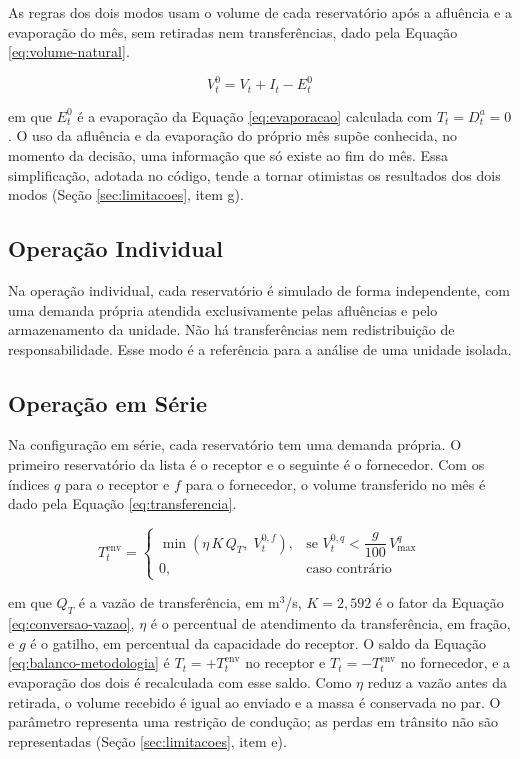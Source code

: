 As regras dos dois modos usam o volume de cada reservatório após a afluência e a evaporação do mês, sem retiradas nem transferências, dado pela Equação \ref{eq:volume-natural}.

\begin{equation}
    V^{0}_t = V_t + I_t - E^{0}_t
    \label{eq:volume-natural}
\end{equation}

em que $E^{0}_t$ é a evaporação da Equação \ref{eq:evaporacao} calculada com $T_t = D^{a}_t = 0$. O uso da afluência e da evaporação do próprio mês supõe conhecida, no momento da decisão, uma informação que só existe ao fim do mês. Essa simplificação, adotada no código, tende a tornar otimistas os resultados dos dois modos (Seção \ref{sec:limitacoes}, item g).

\subsection{Operação Individual}
\label{subsec:operacao-individual}

Na operação individual, cada reservatório é simulado de forma independente, com uma demanda própria atendida exclusivamente pelas afluências e pelo armazenamento da unidade. Não há transferências nem redistribuição de responsabilidade. Esse modo é a referência para a análise de uma unidade isolada.

\subsection{Operação em Série}
\label{subsec:operacao-serie}

Na configuração em série, cada reservatório tem uma demanda própria. O primeiro reservatório da lista é o receptor e o seguinte é o fornecedor. Com os índices $q$ para o receptor e $f$ para o fornecedor, o volume transferido no mês é dado pela Equação \ref{eq:transferencia}.

\begin{equation}
    T^{\mathrm{env}}_t =
    \begin{cases}
        \min\left(\eta\, K\, Q_{T},\; V^{0,f}_t\right), & \text{se } V^{0,q}_t < \dfrac{g}{100}\, V^{q}_{\max}\\[6pt]
        0, & \text{caso contrário}
    \end{cases}
    \label{eq:transferencia}
\end{equation}

em que $Q_{T}$ é a vazão de transferência, em m$^3$/s, $K = 2{,}592$ é o fator da Equação \ref{eq:conversao-vazao}, $\eta$ é o percentual de atendimento da transferência, em fração, e $g$ é o gatilho, em percentual da capacidade do receptor. O saldo da Equação \ref{eq:balanco-metodologia} é $T_t = +T^{\mathrm{env}}_t$ no receptor e $T_t = -T^{\mathrm{env}}_t$ no fornecedor, e a evaporação dos dois é recalculada com esse saldo. Como $\eta$ reduz a vazão antes da retirada, o volume recebido é igual ao enviado e a massa é conservada no par. O parâmetro representa uma restrição de condução; as perdas em trânsito não são representadas (Seção \ref{sec:limitacoes}, item e).

